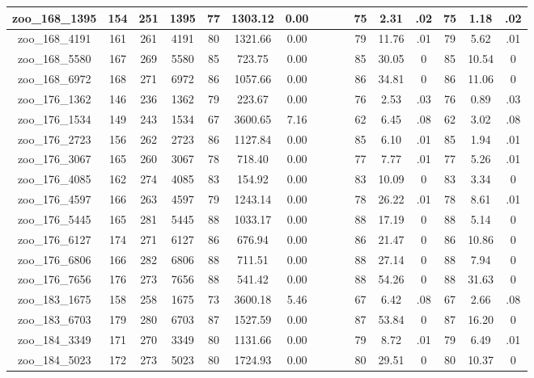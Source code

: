 \begin{landscape}
\begin{longtable}{|c|c|c|c|c|c|c|c|c|c|c|c|c|c|c|c|}
zoo\_168\_1395 & 154 & 251 & 1395 & 77 & 1303.12 & 0.00 &  &  &  & 75 & 2.31 & .02 & 75 & 1.18 & .02 \\ \hline 
zoo\_168\_4191 & 161 & 261 & 4191 & 80 & 1321.66 & 0.00 &  &  &  & 79 & 11.76 & .01 & 79 & 5.62 & .01 \\ \hline 
zoo\_168\_5580 & 167 & 269 & 5580 & 85 & 723.75 & 0.00 &  &  &  & 85 & 30.05 & 0 & 85 & 10.54 & 0 \\ \hline 
zoo\_168\_6972 & 168 & 271 & 6972 & 86 & 1057.66 & 0.00 &  &  &  & 86 & 34.81 & 0 & 86 & 11.06 & 0 \\ \hline 
zoo\_176\_1362 & 146 & 236 & 1362 & 79 & 223.67 & 0.00 &  &  &  & 76 & 2.53 & .03 & 76 & 0.89 & .03 \\ \hline 
zoo\_176\_1534 & 149 & 243 & 1534 & 67 & 3600.65 & 7.16 &  &  &  & 62 & 6.45 & .08 & 62 & 3.02 & .08 \\ \hline 
zoo\_176\_2723 & 156 & 262 & 2723 & 86 & 1127.84 & 0.00 &  &  &  & 85 & 6.10 & .01 & 85 & 1.94 & .01 \\ \hline 
zoo\_176\_3067 & 165 & 260 & 3067 & 78 & 718.40 & 0.00 &  &  &  & 77 & 7.77 & .01 & 77 & 5.26 & .01 \\ \hline 
zoo\_176\_4085 & 162 & 274 & 4085 & 83 & 154.92 & 0.00 &  &  &  & 83 & 10.09 & 0 & 83 & 3.34 & 0 \\ \hline 
zoo\_176\_4597 & 166 & 263 & 4597 & 79 & 1243.14 & 0.00 &  &  &  & 78 & 26.22 & .01 & 78 & 8.61 & .01 \\ \hline 
zoo\_176\_5445 & 165 & 281 & 5445 & 88 & 1033.17 & 0.00 &  &  &  & 88 & 17.19 & 0 & 88 & 5.14 & 0 \\ \hline 
zoo\_176\_6127 & 174 & 271 & 6127 & 86 & 676.94 & 0.00 &  &  &  & 86 & 21.47 & 0 & 86 & 10.86 & 0 \\ \hline 
zoo\_176\_6806 & 166 & 282 & 6806 & 88 & 711.51 & 0.00 &  &  &  & 88 & 27.14 & 0 & 88 & 7.94 & 0 \\ \hline 
zoo\_176\_7656 & 176 & 273 & 7656 & 88 & 541.42 & 0.00 &  &  &  & 88 & 54.26 & 0 & 88 & 31.63 & 0 \\ \hline 
zoo\_183\_1675 & 158 & 258 & 1675 & 73 & 3600.18 & 5.46 &  &  &  & 67 & 6.42 & .08 & 67 & 2.66 & .08 \\ \hline 
zoo\_183\_6703 & 179 & 280 & 6703 & 87 & 1527.59 & 0.00 &  &  &  & 87 & 53.84 & 0 & 87 & 16.20 & 0 \\ \hline 
zoo\_184\_3349 & 171 & 270 & 3349 & 80 & 1131.66 & 0.00 &  &  &  & 79 & 8.72 & .01 & 79 & 6.49 & .01 \\ \hline 
zoo\_184\_5023 & 172 & 273 & 5023 & 80 & 1724.93 & 0.00 &  &  &  & 80 & 29.51 & 0 & 80 & 10.37 & 0 \\ \hline 

\end{longtable}
\end{landscape}
